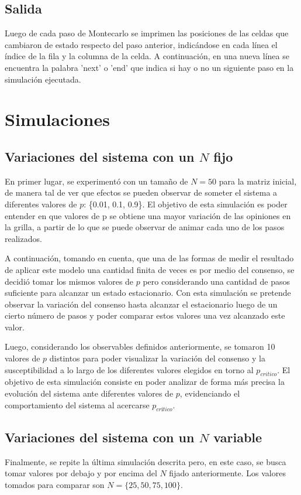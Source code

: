 \documentclass[12pt]{article}
\begin{document}
\subsection{Salida}
Luego de cada paso de Montecarlo se imprimen las posiciones de las celdas que cambiaron de estado respecto del paso anterior, indicándose en cada línea el índice de la fila y la columna de la celda. A continuación, en una nueva línea se encuentra la palabra 'next' o 'end' que indica si hay o no un siguiente paso en la simulación ejecutada.

\section{Simulaciones}
\subsection{Variaciones del sistema con un $N$ fijo}
En primer lugar, se experimentó con un tamaño de $N = 50$ para la matriz inicial, de manera tal de ver que efectos se pueden observar de someter el sistema a diferentes valores de $p$: \{0.01, 0.1, 0.9\}. El objetivo de esta simulación es poder entender en que valores de p se obtiene una mayor variación de las opiniones en la grilla, a partir de lo que se puede observar de animar cada uno de los pasos realizados.

A continuación, tomando en cuenta, que una de las formas de medir el resultado de aplicar este modelo una cantidad finita de veces es por medio del consenso, se decidió tomar los mismos valores de $p$ pero considerando una cantidad de pasos suficiente para alcanzar un estado estacionario. Con esta simulación se pretende observar la variación del consenso hasta alcanzar el estacionario luego de un cierto número de pasos y poder comparar estos valores una vez alcanzado este valor. 

Luego, considerando los observables definidos anteriormente, se tomaron 10 valores de $p$ distintos para poder visualizar la variación del consenso y la susceptibilidad a lo largo de los diferentes valores elegidos en torno al $p_{critico}$. El objetivo de esta simulación consiste en poder analizar de forma más precisa la evolución del sistema ante diferentes valores de $p$, evidenciando el comportamiento del sistema al acercarse $p_{crítico}$.

\subsection{Variaciones del sistema con un $N$ variable}
Finalmente, se repite la última simulación descrita pero, en este caso, se busca tomar valores por debajo y por encima del $N$ fijado anteriormente. Los valores tomados para comparar son $N = \{25,50,75,100\}$. 
 
\end{document}
